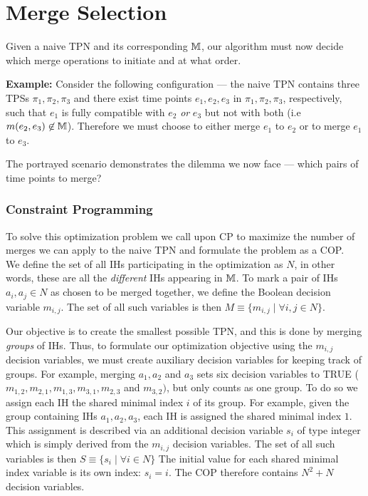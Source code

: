 \section{Merge Selection}
\label{generating: merge selection}
Given a naive TPN and its corresponding $\mathbb{M}$, our algorithm must now decide which 
merge operations to initiate and at what order. 

\begin{tcolorbox}[colback=blue!5!white,colframe=blue!75!black]
     \textbf{Example:} Consider the following configuration --- the naive TPN contains three
     TPSs $\pi_1,\pi_2,\pi_3$ and there exist time points 
     $e_1, e_2, e_3$ in $\pi_1, \pi_2, \pi_3$, respectively, such that $e_1$ is fully
     compatible with $e_2$ \textit{or} $e_3$ but not with both (i.e $m(e_2,e_3) \not \in \mathbb{M}$).
     Therefore we must choose to either merge $e_1$ to $e_2$ or to merge $e_1$ to $e_3$.
  \end{tcolorbox}


The portrayed scenario demonstrates the dilemma we now face --- 
which pairs of time points to merge? 


\subsubsection{Constraint Programming} To solve this optimization problem we call upon
CP to maximize the number of merges we can apply to the naive TPN and formulate the 
problem as a COP. \\ 

We define the set of all IHs participating in the optimization as $N$, in other words,
these are all the {\em different} IHs appearing in $\mathbb{M}$.
To mark a pair of IHs $a_i,a_j \in N$ as chosen to be merged together, 
we define the Boolean decision variable $m_{i,j}$. The set of all such variables is then
 $M \equiv \{m_{i,j} \mid \forall i,j \in N\}$.

Our objective is to create the smallest possible TPN, and this is done by merging {\em groups} of IHs. Thus, to formulate our optimization objective using the $m_{i,j}$ decision variables, we must create auxiliary decision variables for keeping track of groups. For example, merging $a_1, a_2$ and $a_3$ sets six decision variables to TRUE ($m_{1,2}, m_{2,1}, m_{1,3}, m_{3,1}, m_{2,3}$ and $m_{3,2})$, but only counts as one group.
To do so we assign each IH the shared minimal index $i$ of its group.
For example, given the group containing IHs $a_1,a_2,a_3$, each IH is assigned the shared minimal index $1$.
This assignment is described via an additional decision variable $s_i$ of type integer which is simply derived from the $m_{i,j}$ decision variables. The set of all such variables is then $S \equiv \{s_i \mid \forall i \in N\}$
The initial value for each shared minimal index variable is its own index: $s_i = i$.
The COP therefore contains $N^2 + N$ decision variables.

